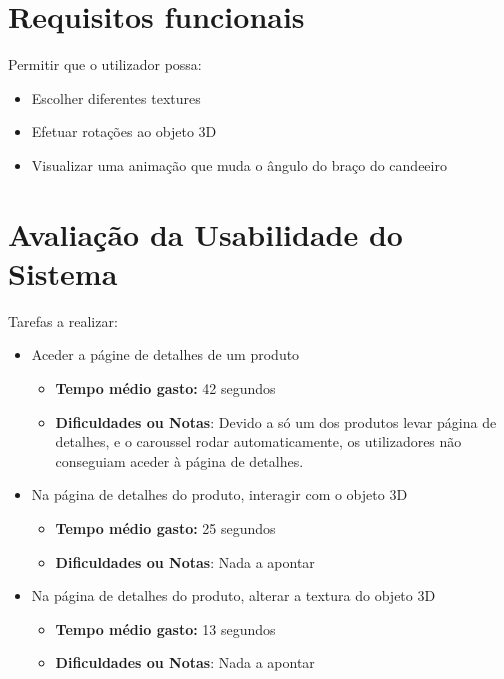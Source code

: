 \documentclass[a4paper,12pt]{article}
\begin{document}
\newpage
\section{Requisitos funcionais}
    Permitir que o utilizador possa:
    \begin{itemize}
        \item Escolher diferentes textures
        \item Efetuar rotações ao objeto 3D
        \item Visualizar uma animação que muda o ângulo do braço do candeeiro
    \end{itemize}

\newpage
\section{Avaliação da Usabilidade do Sistema}

Tarefas a realizar:
\begin{itemize}
    \item Aceder a págine de detalhes de um produto
      \begin{itemize}
        \item \textbf{Tempo médio gasto:} 42 segundos
        \item \textbf{Dificuldades ou Notas}: Devido a só um dos produtos levar página de detalhes, e o caroussel rodar automaticamente, os utilizadores não conseguiam aceder à página de detalhes.
      \end{itemize}
    \item Na página de detalhes do produto, interagir com o objeto 3D
      \begin{itemize}
        \item \textbf{Tempo médio gasto:} 25 segundos
        \item \textbf{Dificuldades ou Notas}: Nada a apontar
      \end{itemize}
    \item Na página de detalhes do produto, alterar a textura do objeto 3D
      \begin{itemize}
        \item \textbf{Tempo médio gasto:} 13 segundos
        \item \textbf{Dificuldades ou Notas}: Nada a apontar
      \end{itemize}
\end{itemize}

\vspace{0.5cm}
\end{document}
